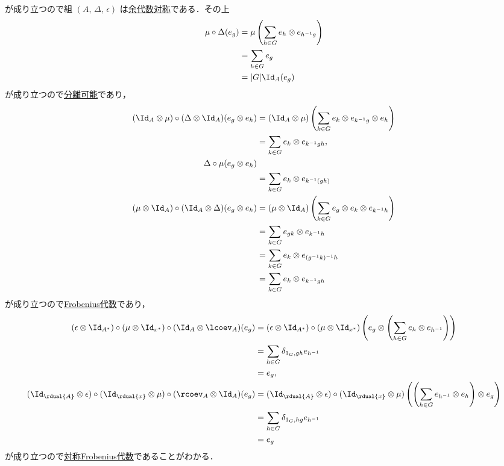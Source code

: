 \documentclass[TQFT_main]{subfiles}
\begin{document}
が成り立つので組 $(A,\, \Delta,\, \epsilon)$ は\hyperref[def:algobj]{余代数対称}である．その上
\begin{align}
    \mu \circ \Delta (e_g) 
    &= \mu \left(\sum_{h \in G} e_h \otimes e_{h^{-1} g}\right) \\
    &= \sum_{h \in G} e_{g} \\
    &= \abs{G} \Id_A (e_g)
\end{align}
が成り立つので\hyperref[def:separable-alg]{分離可能}であり，
\begin{align}
    (\Id_A \otimes \mu) \circ (\Delta \otimes \Id_A) (e_g \otimes e_h) 
    &= (\Id_A \otimes \mu) \left(\sum_{k \in G} e_k \otimes e_{k^{-1}g} \otimes e_h \right) \\
    &= \sum_{k \in G} e_k \otimes e_{k^{-1}gh}, \\
    \Delta \circ \mu (e_g \otimes e_h) \\
    &= \sum_{k \in G} e_k \otimes e_{k^{-1}(gh)} \\
    (\mu\otimes \Id_A) \circ (\Id_A\otimes \Delta) (e_g \otimes e_h)
    &= (\mu \otimes \Id_A) \left( \sum_{k \in G} e_g \otimes e_k \otimes e_{k^{-1} h} \right)  \\
    &= \sum_{k \in G} e_{gk} \otimes e_{k^{-1} h} \\
    &= \sum_{k \in G} e_{k} \otimes e_{(g^{-1}k)^{-1} h} \\
    &= \sum_{k \in G} e_{k} \otimes e_{k^{-1} gh}
\end{align}
が成り立つので\hyperref[def:Frobenius-alg]{Frobenius代数}であり，
\begin{align}
    (\epsilon \otimes \Id_{A^*}) \circ (\mu \otimes \Id_{x^*}) \circ (\Id_A \otimes \lcoev_A) (e_g)
    &=(\epsilon \otimes \Id_{A^*}) \circ (\mu \otimes \Id_{x^*}) \left(e_g \otimes \left( \sum_{h \in G} e_h \otimes e_{h^{-1}}\right) \right) \\
    &= \sum_{h \in G} \delta_{1_G,gh} e_{h^{-1}} \\
    &= e_g, \\
    (\Id_{\rdual{A}} \otimes \epsilon) \circ (\Id_{\rdual{x}} \otimes \mu) \circ (\rcoev_A \otimes \Id_A) (e_g)
    &= (\Id_{\rdual{A}} \otimes \epsilon) \circ (\Id_{\rdual{x}} \otimes \mu) \left( \left( \sum_{h \in G} e_{h^{-1}} \otimes e_{h}\right) \otimes e_g \right) \\
    &= \sum_{h \in G} \delta_{1_G,hg} e_{h^{-1}} \\
    &= e_g
\end{align}
が成り立つので\hyperref[def:sym-Frobenius]{対称Frobenius代数}であることがわかる．
\end{document}

